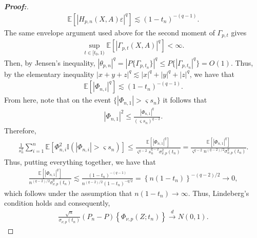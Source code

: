 \documentclass[11pt,twoside]{article}
\theoremstyle{definition}
\theoremstyle{remark}
\begin{document}
\begin{proof}[\textbf{Proof:}]
\begin{align*}
    \mathbb{E}\left[ \left| H_{p,n}(X,A)\varepsilon \right|^q \right] \lesssim
    (1-t_n)^{-(q-1)}.
\end{align*}
The same envelope argument used above for the second moment of
$\Gamma_{p,t}$ gives
\begin{align*}
    \sup_{t\in[t_0,1)} \mathbb{E} \left[ \left| \Gamma_{p,t}(X,A) \right|^q \right] <\infty.
\end{align*}
Then, by Jensen's inequality, $|\theta_{p,n}|^q = |P\{\Gamma_{p,t_n}\}|^q \leq P \{|\Gamma_{p,t_n}|^q \} = O(1)$. Thus, by the elementary inequality $|x+y+z|^q\lesssim |x|^q+|y|^q+|z|^q$, we have that
\begin{align*}
       \mathbb{E}\left[ |\Phi_{n,i}|^q \right] \lesssim (1-t_n)^{-(q-1)}.
\end{align*}
From here, note that on the event $\{|\Phi_{n,1}|> \varsigma s_n\}$ it follows that
\begin{align*}
    |\Phi_{n,1}|^2 \leq \frac{ |\Phi_{n,1}|^q }{(\varsigma s_n)^{q-2}}.
\end{align*}
Therefore,
\begin{align*}
    \frac{1}{s_n^2} \sum_{i=1}^{n} \mathbb{E}\!\left[ \Phi_{n,i}^2 \mathbb{I}\!\left( |\Phi_{n,i}|>\varsigma s_n \right) \right] \leq  \frac{ \mathbb{E}\left[ |\Phi_{n,1}|^q \right]}{\varsigma^{q-2}s_n^{q-2} \sigma_{\nu,p}^2(t_n)} =  \frac{ \mathbb{E}\left[ |\Phi_{n,1}|^q \right]}{ \varsigma^{q-2} n^{(q-2)/2} \sigma_{\nu,p}^q(t_n)}.
\end{align*}
Thus, putting everything together, we have that
\begin{align*}
    \frac{ \mathbb{E}\left[ |\Phi_{n,1}|^q \right]}{ n^{(q-2)/2} \sigma_{\nu,p}^q(t_n)} \lesssim \frac{ (1-t_n)^{-(q-1)} }{ n^{(q-2)/2} (1-t_n)^{-q/2} } = \left\{ n(1-t_n) \right\}^{-(q-2)/2} \longrightarrow 0,
\end{align*}
which follows under the assumption that $n(1-t_n) \to \infty$. Thus, Lindeberg's condition holds and consequently,
\begin{align*}
     \frac{\sqrt{n}}{\sigma_{\nu,p}(t_n)} (P_n-P) \left\{ \Phi_{\nu,p}(Z;t_n) \right\} \overset{d}{\longrightarrow} N(0,1).
\end{align*}


\medskip 


\end{proof}
\end{document}
